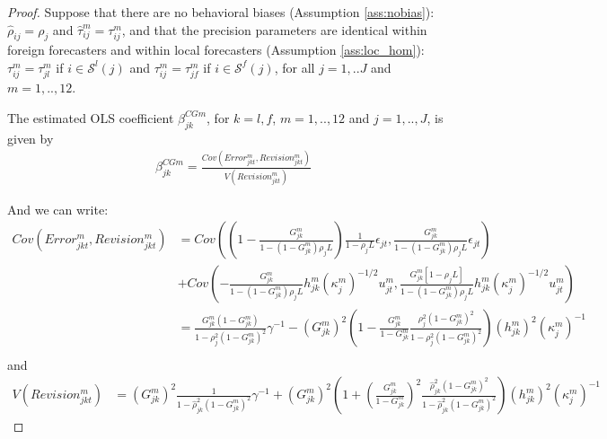 \begin{proof}

Suppose that there are no behavioral biases (Assumption \ref{ass:nobias}): $\hat\rho_{ij}=\rho_j$ and $\hat\tau_{ij}^m=\tau_{ij}^m$, and that the precision parameters are identical within foreign forecasters and within local forecasters (Assumption \ref{ass:loc_hom}): $\tau_{ij}^m=\tau_{jl}^m$ if $i\in\mathcal{S}^l(j)$ and $\tau_{ij}^m=\tau_{jf}^m$ if $i\in\mathcal{S}^f(j)$, for all $j=1,..J$ and $m=1,..,12$.

The estimated OLS coefficient $\beta^{CGm}_{jk}$, for $k=l,f$, $m=1,..,12$ and $j=1,..,J$, is given by
\begin{equation}\begin{array}{ll}\beta^{CGm}_{jk}  = \frac{Cov\left(Error_{jkt}^m,Revision_{jkt}^m\right)}{V\left(Revision_{jkt}^m\right)}\label{eq:beta}\end{array}\end{equation}

And we can write:																
$$\begin{array}{ll}Cov\left(Error_{jkt}^m,Revision_{jkt}^m\right) &=Cov\left(\left(1-\frac{G_{jk}^m}{1-(1-G_{jk}^m)\rho_{j}L}\right)\frac{1}{1-\rho_{j}L}\epsilon_{jt},\frac{G_{jk}^m}{1-(1-G_{jk}^m)\rho_{j}L}\epsilon_{jt}\right)\\
&+Cov\left(-\frac{G_{jk}^m}{1-(1-G_{jk}^m)\rho_{j}L}h_{jk}^m(\kappa_j^m)^{-1/2}u_{jt}^m,\frac{G_{jk}^m[1-\rho_{j}L]}{1-(1-G_{jk}^m)\rho_{j}L}h_{jk}^m(\kappa_j^m)^{-1/2}u_{jt}^m\right)\\
&=\frac{G_{jk}^m(1-G_{jk}^m)}{1-\rho_{j}^2(1-G_{jk}^m)^2}\gamma^{-1} -(G_{jk}^m)^2\left(1-\frac{G_{jk}^m}{1-G_{jk}^m}\frac{\rho_{j}^{2}(1-G_{jk}^m)^{2}}{1-\rho_{j}^{2}(1-G_{jk}^m)^{2}}\right)(h_{jk}^m)^2(\kappa_j^m)^{-1}\\
\end{array}$$
and
$$\begin{array}{ll}V(Revision_{jkt}^m)&=(G_{jk}^m)^2\frac{1}{1-\hat\rho_{jk}^2(1-G_{jk}^m)^2}\gamma^{-1} + (G_{jk}^m)^2\left(1+\left(\frac{G_{jk}^m}{1-G_{jk}^m}\right)^2\frac{\hat\rho_{jk}^{2}(1-G_{jk}^m)^{2}}{1-\hat\rho_{jk}^{2}(1-G_{jk}^m)^{2}}\right)(h_{jk}^m)^2(\kappa_j^m)^{-1}
\end{array}$$


\end{proof}
